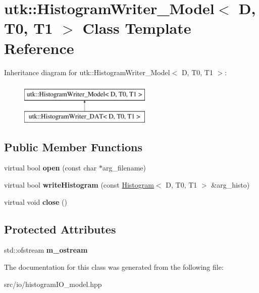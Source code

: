 \hypertarget{classutk_1_1HistogramWriter__Model}{\section{utk\-:\-:Histogram\-Writer\-\_\-\-Model$<$ D, T0, T1 $>$ Class Template Reference}
\label{classutk_1_1HistogramWriter__Model}
}
Inheritance diagram for utk\-:\-:Histogram\-Writer\-\_\-\-Model$<$ D, T0, T1 $>$\-:\begin{figure}[H]
\begin{center}
\leavevmode
\includegraphics[height=2.000000cm]{classutk_1_1HistogramWriter__Model}
\end{center}
\end{figure}
\subsection*{Public Member Functions}
\begin{DoxyCompactItemize}
\item 
\hypertarget{classutk_1_1HistogramWriter__Model_aba728608db779568470bcd2a6bda5ccd}{virtual bool {\bfseries open} (const char $\ast$arg\-\_\-filename)}\label{classutk_1_1HistogramWriter__Model_aba728608db779568470bcd2a6bda5ccd}

\item 
\hypertarget{classutk_1_1HistogramWriter__Model_a3f61ef43c491772a6f7e3c7e66d120c7}{virtual bool {\bfseries write\-Histogram} (const \hyperlink{classutk_1_1Histogram}{Histogram}$<$ D, T0, T1 $>$ \&arg\-\_\-histo)}\label{classutk_1_1HistogramWriter__Model_a3f61ef43c491772a6f7e3c7e66d120c7}

\item 
\hypertarget{classutk_1_1HistogramWriter__Model_acda871e41b745a921ec128bee68411b3}{virtual void {\bfseries close} ()}\label{classutk_1_1HistogramWriter__Model_acda871e41b745a921ec128bee68411b3}

\end{DoxyCompactItemize}
\subsection*{Protected Attributes}
\begin{DoxyCompactItemize}
\item 
\hypertarget{classutk_1_1HistogramWriter__Model_afdfe83db87472dd57e39fb7e645f2208}{std\-::ofstream {\bfseries m\-\_\-ostream}}\label{classutk_1_1HistogramWriter__Model_afdfe83db87472dd57e39fb7e645f2208}

\end{DoxyCompactItemize}


The documentation for this class was generated from the following file\-:\begin{DoxyCompactItemize}
\item 
src/io/histogram\-I\-O\-\_\-model.\-hpp\end{DoxyCompactItemize}
